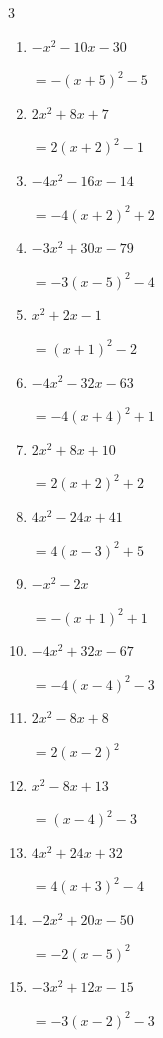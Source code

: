 \begin{multicols}{3}
\begin{enumerate}
  \item $-x^{2}-10x-30$

        $=-\left( x+5\right)^{2}-5$

  \item $2x^{2}+8x+7$

        $=2\left( x+2\right)^{2}-1$

  \item $-4x^{2}-16x-14$

        $=-4\left( x+2\right)^{2}+2$

  \item $-3x^{2}+30x-79$

        $=-3\left( x-5\right)^{2}-4$

  \item $x^{2}+2x-1$

        $=\left( x+1\right)^{2}-2$

\columnbreak %

  \item $-4x^{2}-32x-63$

        $=-4\left( x+4\right)^{2}+1$

  \item $2x^{2}+8x+10$

        $=2\left( x+2\right)^{2}+2$

  \item $4x^{2}-24x+41$

        $=4\left( x-3\right)^{2}+5$

  \item $-x^{2}-2x$

        $=-\left( x+1\right)^{2}+1$

  \item $-4x^{2}+32x-67$

        $=-4\left( x-4\right)^{2}-3$

  \item $2x^{2}-8x+8$

        $=2\left( x-2\right)^{2}$

  \item $x^{2}-8x+13$

        $=\left( x-4\right)^{2}-3$

  \item $4x^{2}+24x+32$

        $=4\left( x+3\right)^{2}-4$

  \item $-2x^{2}+20x-50$

        $=-2\left( x-5\right)^{2}$

  \item $-3x^{2}+12x-15$

        $=-3\left( x-2\right)^{2}-3$

\end{enumerate}
\end{multicols}
